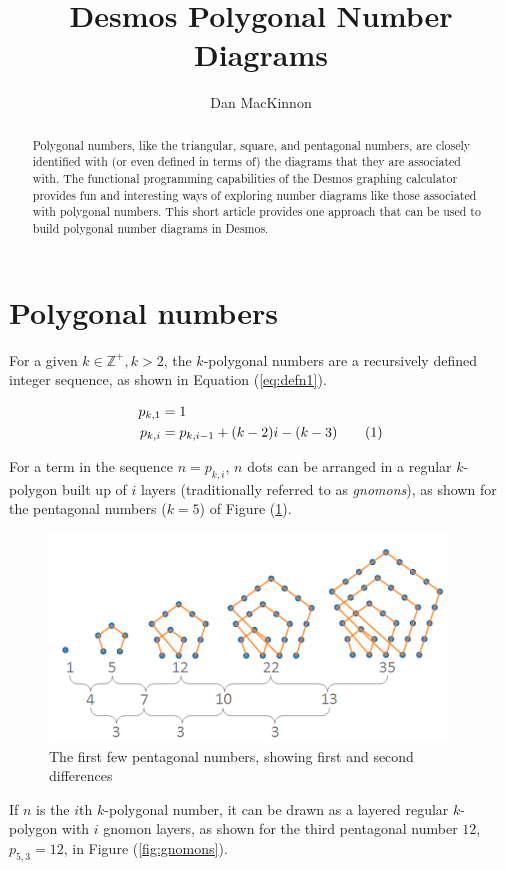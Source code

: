 \documentclass[notitlepage]{report}
\title{Desmos Polygonal Number Diagrams}
\author{Dan MacKinnon}
\newcommand\numberthis{\addtocounter{equation}{1}\tag{\theequation}}
\begin{document}
\maketitle
\begin{abstract}
\noindent
Polygonal numbers, like the triangular, square, and pentagonal numbers, are closely identified with (or even defined in terms of) the diagrams that they are associated with. The functional programming capabilities of the Desmos graphing calculator provides fun and interesting ways of exploring number diagrams like those associated with polygonal numbers. This short article provides one approach that can be used to build polygonal number diagrams in Desmos.  
\end{abstract}

\section*{Polygonal numbers}
For a given $k \in \mathbb{Z}^+, k>2$, the $k$-polygonal numbers are a recursively defined integer sequence, as shown in Equation (\ref{eq:defn1}). 

\begin{align*}
    p_{k, 1} &= 1 \\
    p_{k,i} &= p_{k,i-1} + (k-2)i - (k-3)
    \numberthis
    \label{eq:defn1}
\end{align*}

For a term in the sequence $n = p_{k,i}$, $n$ dots can be arranged in a regular $k$-polygon built up of $i$ layers (traditionally referred to as \textit{gnomons}), as shown for the pentagonal numbers ($k=5$) of Figure (\ref{fig:pentagonals}). 

\begin{figure}[!htb]
    \centering
    \includegraphics[width=0.5\linewidth]{pentagonal_numbers.PNG}
    \caption{The first few pentagonal numbers, showing first and second differences}
    \label{fig:pentagonals}
\end{figure}

If $n$ is the $i$th $k$-polygonal number, it can be drawn as a layered regular $k$-polygon with $i$ gnomon layers, as shown for the third pentagonal number $12$, $p_{5,3}=12$, in Figure (\ref{fig:gnomons}).
\end{document}
